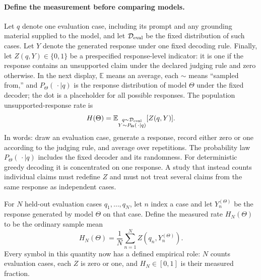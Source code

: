 \documentclass[
  aps,
  reprint,
  superscriptaddress,
  floatfix,
  nofootinbib,
  longbibliography
]{revtex4-2}
\newcommand{\E}{\mathbb{E}}
\begin{document}
\paragraph{Define the measurement before comparing models.}
Let $q$ denote one evaluation case, including its prompt and any grounding
material supplied to the model, and let $\mathcal D_{\rm eval}$ be the fixed
distribution of such cases.  Let $Y$ denote the generated response under one
fixed decoding rule.  Finally, let $Z(q,Y)\in\{0,1\}$ be a prespecified
response-level indicator: it is one if the response contains an unsupported
claim under the declared judging rule and zero otherwise.  In the next display,
$\E$ means an average, each $\sim$ means ``sampled from,'' and
$P_\Theta(\,\cdot\mid q)$ is the response distribution of model $\Theta$ under
the fixed decoder; the dot is a placeholder for all possible responses.  The
population unsupported-response rate is
\begin{equation}
\label{eq:app-hallucination-population}
H(\Theta)
=\E_{\substack{q\sim\mathcal D_{\rm eval}\\
Y\sim P_\Theta(\,\cdot\mid q)}}[Z(q,Y)].
\end{equation}
In words: draw an evaluation case, generate a response, record either zero or
one according to the judging rule, and average over repetitions.
The probability law $P_\Theta(\,\cdot\mid q)$ includes the fixed decoder and
its randomness.  For deterministic greedy decoding it is concentrated on one
response.  A study that instead counts individual claims must redefine $Z$ and
must not treat several claims from the same response as independent cases.

For $N$ held-out evaluation cases $q_1,\ldots,q_N$, let $n$ index a case and
let $Y_n^{(\Theta)}$ be the response generated by model $\Theta$ on that case.
Define the measured rate $H_N(\Theta)$ to be the ordinary sample mean
\begin{equation}
\label{eq:app-hallucination-rate}
H_N(\Theta)=\frac{1}{N}\sum_{n=1}^{N}
Z(q_n,Y_n^{(\Theta)}).
\end{equation}
Every symbol in this quantity now has a defined empirical role: $N$ counts evaluation
cases, each $Z$ is zero or one, and $H_N\in[0,1]$ is their measured fraction.
\end{document}

